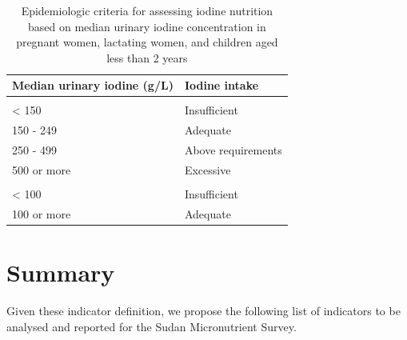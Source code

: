 \documentclass[12pt,a4paper]{article}
\begin{document}
\begin{table}[H]

\caption{\label{tab:iodine2}Epidemiologic criteria for assessing iodine nutrition based on median urinary iodine concentration in pregnant women, lactating women, and children aged less than 2 years}
\centering
\begin{tabular}[t]{ll}
\toprule
\textbf{Median urinary iodine (g/L)} & \textbf{Iodine intake}\\
\midrule
\rowcolor{gray!6}  \addlinespace[0.3em]
\multicolumn{2}{l}{\textbf{Pregnant women}}\\
\hspace{1em}< 150 & Insufficient\\
\hspace{1em}150 - 249 & Adequate\\
\rowcolor{gray!6}  \hspace{1em}250 - 499 & Above requirements\\
\hspace{1em}500 or more & Excessive\\
\rowcolor{gray!6}  \addlinespace[0.3em]
\multicolumn{2}{l}{\textbf{Lactating women and children aged less than 2 years}}\\
\hspace{1em}< 100 & Insufficient\\
\hspace{1em}100 or more & Adequate\\
\bottomrule
\end{tabular}
\end{table}

\hypertarget{summary}{%
\section{Summary}\label{summary}}

Given these indicator definition, we propose the following list of indicators to be analysed and reported for the Sudan Micronutrient Survey.
\end{document}
